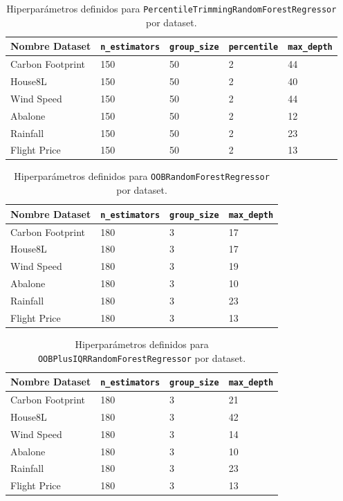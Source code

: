 \begin{table}[h]
\centering
    \caption{Hiperparámetros definidos para \texttt{PercentileTrimmingRandomForestRegressor} por dataset.}
\begin{tabularx}{\textwidth}{l X X X X}
\toprule
\textbf{Nombre Dataset} & \textbf{\texttt{n\_estimators}} & \textbf{\texttt{group\_size}} & \textbf{\texttt{percentile}} &\textbf{\texttt{max\_depth}} \\
\midrule
Carbon Footprint & 150 & 50 & 2 & 44 \\
House8L & 150 & 50 & 2 & 40 \\
Wind Speed & 150 & 50 & 2 & 44 \\
Abalone & 150 & 50 & 2 & 12 \\
Rainfall & 150 & 50 & 2 & 23 \\
Flight Price & 150 & 50 & 2 & 13 \\
\bottomrule
\end{tabularx}
\end{table}

\begin{table}[h]
\centering
    \caption{Hiperparámetros definidos para \texttt{OOBRandomForestRegressor} por dataset.}
\begin{tabularx}{\textwidth}{l X X X}
\toprule
\textbf{Nombre Dataset} & \textbf{\texttt{n\_estimators}} & \textbf{\texttt{group\_size}} & \textbf{\texttt{max\_depth}} \\
\midrule
Carbon Footprint & 180 & 3 & 17 \\
House8L & 180 & 3 & 17 \\
Wind Speed & 180 & 3 & 19 \\
Abalone & 180 & 3 & 10 \\
Rainfall & 180 & 3 & 23 \\
Flight Price & 180 & 3 & 13 \\
\bottomrule
\end{tabularx}
\end{table}

\begin{table}[h]
\centering
    \caption{Hiperparámetros definidos para \texttt{OOBPlusIQRRandomForestRegressor} por dataset.}
\begin{tabularx}{\textwidth}{l X X X}
\toprule
\textbf{Nombre Dataset} & \textbf{\texttt{n\_estimators}} & \textbf{\texttt{group\_size}} & \textbf{\texttt{max\_depth}} \\
\midrule
Carbon Footprint & 180 & 3 & 21 \\
House8L & 180 & 3 & 42 \\
Wind Speed & 180 & 3 & 14 \\
Abalone & 180 & 3 & 10 \\
Rainfall & 180 & 3 & 23 \\
Flight Price & 180 & 3 & 13 \\
\bottomrule
\end{tabularx}
\end{table}

